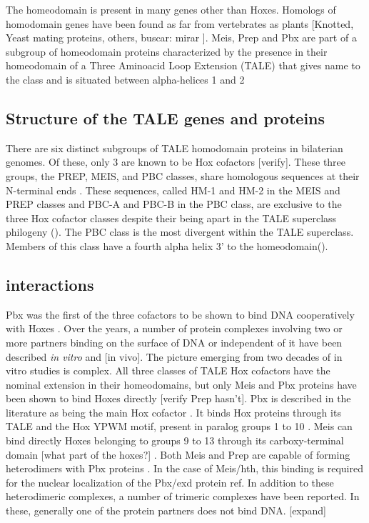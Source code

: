 The homeodomain is present in many genes other than Hoxes. Homologs of homodomain genes have been found as far from vertebrates as plants [Knotted, Yeast mating proteins, others, buscar: mirar \cite{Burglin1997}]. Meis, Prep and Pbx are part of a subgroup of homeodomain proteins characterized by the presence in their homeodomain of a Three Aminoacid Loop Extension (TALE) that gives name to the class and is situated between alpha-helices 1 and 2 \cite{Bertolino1995, Burglin1997, Mukherjee2007, Moens2006}

\subsection{Structure of the TALE genes and proteins}
	
		There are six distinct subgroups of TALE homodomain proteins in bilaterian genomes. Of these, only 3 are known to be Hox cofactors [verify]. These three groups, the PREP, MEIS, and PBC classes, share homologous sequences at their N-terminal ends \cite{Burglin1998}. These sequences, called HM-1 and HM-2 in the MEIS and PREP classes and PBC-A and PBC-B in the PBC class, are exclusive to the three Hox cofactor classes despite their being apart in the TALE superclass philogeny (\cite{Mukherjee2007}).
		The PBC class is the most divergent within the TALE superclass. Members of this class have a fourth alpha helix 3' to the homeodomain(\cite{Mukherjee2007}). 

\subsection{interactions}

		Pbx was the first of the three cofactors to be shown to bind DNA cooperatively with Hoxes \cite{ref}. Over the years, a number of protein complexes involving two or more partners binding on the surface of DNA or independent of it have been described \textit{in vitro} and [in vivo]. The picture emerging from two decades of in vitro studies is complex. 
		All three classes of TALE Hox cofactors have the nominal extension in their homeodomains, but only Meis and Pbx proteins have been shown to bind Hoxes directly [verify Prep hasn't]. Pbx is described in the literature as being the main Hox cofactor \cite{ref}. It binds Hox proteins through its TALE and the Hox YPWM motif, present in paralog groups 1 to 10 \cite{refs, Passner1999}. Meis can bind directly Hoxes belonging to groups 9 to 13 through its carboxy-terminal domain [what part of the hoxes?] \cite{ref}. 
		Both Meis and Prep are capable of forming heterodimers with Pbx proteins \cite{ref}. In the case of Meis/hth, this binding is required for the nuclear localization of the Pbx/exd protein {ref}. 
		In addition to these heterodimeric complexes, a number of trimeric complexes have been reported. In these, generally one of the protein partners does not bind DNA. [expand]

